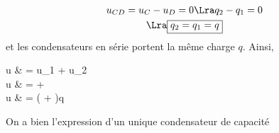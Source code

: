 \documentclass[../../main/main.tex]{subfiles}
\begin{document}
\begin{tcbraster}[raster columns=2, raster equal height=rows]
\begin{tcb}[label=demo:cserie]
{			\begin{gather*}
				u_{CD} = u_{C} - u_{D} = 0 \Lra q_2 - q_1 = 0
				\\\Lra
				\boxed{q_2 = q_1 = q}
			\end{gather*}
			et les condensateurs en série portent la même charge $q$. Ainsi,
			\begin{DispWithArrows*}
				u & = u_1 + u_2
				\\\Lra
				u & =  + 
				\\\Lra
				u & = \left( + \right)q
			\end{DispWithArrows*}
			On a bien l'expression d'un unique condensateur de capacité
		}
	\end{tcb}
\end{tcbraster}
\end{document}
